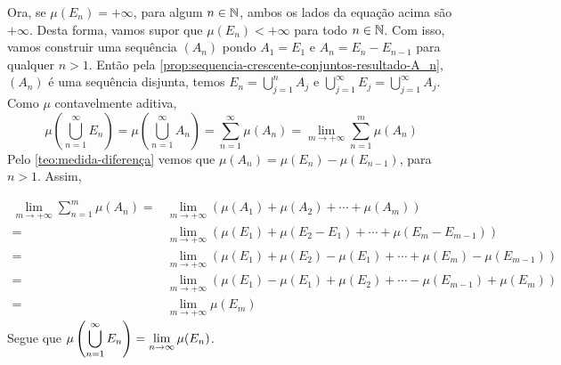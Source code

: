 \begin{prova}
    Ora, se $\mu(E_n) = +\infty$, para algum $n \in \operatorname{\mathbb{N}}$, ambos os lados da equação acima são $+\infty$.
    Desta forma, vamos supor que $\mu(E_n) < +\infty$ para todo $n \in \operatorname{\mathbb{N}}$.
    Com isso, vamos construir uma sequência $(A_n)$ pondo $A_1 = E_1$ e $A_n = E_n - E_{n-1}$ para qualquer $n>1$.
    Então pela \ref{prop:sequencia-crescente-conjuntos-resultado-A_n}, $(A_n)$ é uma sequência disjunta, temos $E_n = \bigcup_{j = 1}^n A_j$ e $\bigcup_{j = 1}^\infty E_j = \bigcup_{j = 1}^\infty A_j$.
    Como $\mu$ contavelmente aditiva, 
    $$\mu\left(\bigcup_{n = 1}^\infty E_n\right)
    =\mu\left(\bigcup_{n = 1}^\infty A_n\right)
    = \sum_{n = 1}^\infty \mu(A_n)
    = \lim_{m \to +\infty}\sum_{n = 1}^m \mu(A_n)$$
    Pelo  \ref{teo:medida-diferença} vemos que $\mu(A_n) = \mu(E_n) - \mu(E_{n - 1 })$, para $n > 1$.
    Assim, 
    
    \begin{align*}
        \lim_{m \to +\infty}\sum_{n = 1}^m \mu(A_n)
        =&
        \lim_{m \to +\infty}(\mu(A_1) + \mu(A_2) + \cdots +\mu(A_m))\\
        =&
        \lim_{m \to +\infty}(\mu(E_1) + \mu(E_2 - E_1) + \cdots +\mu(E_m - E_{m-1}))\\
        =&
        \lim_{m \to +\infty}(\mu(E_1) + \mu(E_2) - \mu(E_1) + \cdots +\mu(E_m) - \mu(E_{m-1}))\\
        =&
        \lim_{m \to +\infty}(\mu(E_1) - \mu(E_1) + \mu(E_2)  + \cdots  - \mu(E_{m-1}) +\mu(E_m) )\\
        =&
        \lim_{m \to +\infty} \mu(E_m)
    \end{align*}
    Segue que $\mu\left(\displaystyle \bigcup_{n = 1}^\infty E_n\right) = \displaystyle \lim_{n \to \infty} \mu(E_n)$.





    


\end{prova}


